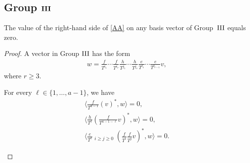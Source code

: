 \subsection[Group ${\rm III}$]{Group $\boldsymbol{{\rm III}}$}
\begin{prop}\label{Pr1}The value of the right-hand side of \eqref{AA} on any basis vector of Group~${\rm III}$ equals zero.
\end{prop}
\begin{proof}A vector in Group ${\rm III}$ has the form
\begin{gather*}
w= \frac{f}{T^{i_1}}\cdots\frac{f}{T^{i_r}}
\frac{h}{T^{j_1}}\cdots\frac{h}{T^{j_s}}
\frac{e}{T^{l_1}}\cdots\frac{e}{T^{l_{r-1}}}v,
\end{gather*}
where $r \geq 3$.

\begin{lem}\label{Group 1}For every $\ell \in \{1, \dots, a-1 \}$, we have
\begin{gather}
\bigg\langle \frac{f}{T^{a-1}} (v)^*, w \bigg\rangle =0, \label{G31} \\
\bigg\langle \frac{h}{T^{\ell}} \left(\frac{f}{T^{a-1-\ell}}v\right)^*, w \bigg\rangle =0, \label{G32} \\
 \bigg\langle \frac{e}{T^{\ell}} \mathop{\sum_{i+j=a-1-\ell}}_{i\geq j\geq 0} \left(\frac{f}{T^i}\frac{f}{T^j}v\right)^*, w \bigg\rangle = 0. \label{G33}
\end{gather}
\end{lem}


\end{proof}
